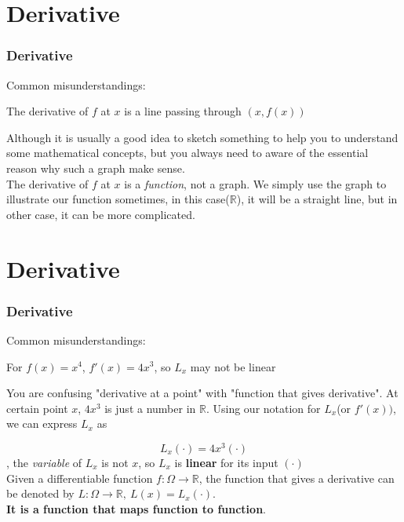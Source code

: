 \documentclass[12pt, t]{beamer}
\renewcommand{\emph}[1]{{\color{Turquoise3}\textsl{#1}}}
\begin{document}
\section{Derivative}
\begin{frame}
    \frametitle{Derivative}
    Common misunderstandings:\\
    \vspace{0.5em}
    \begin{center}
        The derivative of $f$ at $x$ is a line passing through $(x,f(x))$
    \end{center}
    \vspace{0.5em}

    \hspace{1em} Although it is usually a good idea to sketch something to help you to understand some mathematical concepts, but you always need to
    aware of the essential reason why such a graph make sense.\\
    \vspace{1em}
    \hspace{1em} The derivative of $f$ at $x$ is a \emph{function}, not a graph. We simply use the graph to illustrate our function sometimes, in
    this case($\mathbb{R}$), it will be a straight line, but in other case, it can be more complicated.


    \hspace{1em}

\end{frame}

\section{Derivative}
\begin{frame}
    \frametitle{Derivative}

    Common misunderstandings:\\
    \vspace{0.5em}
    \begin{center}
        For $f(x)=x^4$, $f'(x)=4x^3$, so $L_x$ may not be linear
    \end{center}
    \vspace{0.5em}

    \hspace{1em} You are confusing "derivative at a point" with "function that gives derivative".
    At certain point $x$, $4x^3$ is just a number in $\mathbb{R}$. Using our notation for $L_x$(or $f'(x))$, we
    can express $L_x$ as

    \begin{equation*}
        L_x(\cdot)=4x^3(\cdot)
    \end{equation*}
    , the \emph{variable} of $L_x$ is not $x$, so $L_x$ is \textbf{linear} for its input $(\cdot)$\\
    \vspace{1em}
    Given a differentiable function $f:\Omega\rightarrow\mathbb{R}$, the function
    that gives a derivative can be denoted by $L:\Omega\rightarrow\mathbb{R},\ L(x)=L_x(\cdot)$.\\
    \textbf{It is a function that maps function to function}.


\end{frame}
\end{document}
